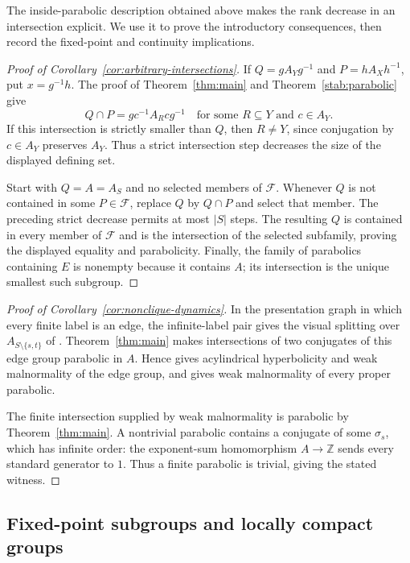 The inside-parabolic description obtained above makes the rank decrease
in an intersection explicit. We use it to prove the introductory
consequences, then record the fixed-point and continuity implications.

\begin{proof}[Proof of Corollary~\ref{cor:arbitrary-intersections}]
If $Q=gA_Yg^{-1}$ and $P=hA_Xh^{-1}$, put $x=g^{-1}h$. The proof of
Theorem~\ref{thm:main} and Theorem~\ref{stab:parabolic} give
\[
 Q\cap P=g c^{-1}A_Rc g^{-1}
 \quad\text{for some }R\subseteq Y\text{ and }c\in A_Y.
\]
If this intersection is strictly smaller than $Q$, then $R\ne Y$, since
conjugation by $c\in A_Y$ preserves $A_Y$. Thus a strict intersection step
decreases the size of the displayed defining set.

Start with $Q=A=A_S$ and no selected members of $\mathcal F$. Whenever $Q$
is not contained in some $P\in\mathcal F$, replace $Q$ by $Q\cap P$ and
select that member. The preceding strict decrease permits at most $|S|$
steps. The resulting $Q$ is contained in every member of $\mathcal F$ and
is the intersection of the selected subfamily, proving the displayed
equality and parabolicity. Finally, the family of parabolics containing
$E$ is nonempty because it contains $A$; its intersection is the unique
smallest such subgroup.
\end{proof}

\begin{proof}[Proof of Corollary~\ref{cor:nonclique-dynamics}]
In the presentation graph in which every finite label is an edge, the
infinite-label pair gives the visual splitting over
$A_{S\setminus\{s,t\}}$ of
\cite[Definition~2.4]{CharneyMartinMorrisWright2026}.
Theorem~\ref{thm:main} makes intersections of two conjugates of this edge
group parabolic in $A$. Hence
\cite[Theorem~3.2]{CharneyMartinMorrisWright2026} gives acylindrical
hyperbolicity and weak malnormality of the edge group, and
\cite[Proposition~4.2]{CharneyMartinMorrisWright2026} gives weak malnormality
of every proper parabolic.

The finite intersection supplied by weak malnormality is parabolic by
Theorem~\ref{thm:main}. A nontrivial parabolic contains a conjugate of
some $\sigma_s$, which has infinite order: the exponent-sum homomorphism
$A\to\mathbb Z$ sends every standard generator to $1$. Thus a finite
parabolic is trivial, giving the stated witness.
\end{proof}

\subsection{Fixed-point subgroups and locally compact groups}
\label{sec:fixed-point-consequences}

